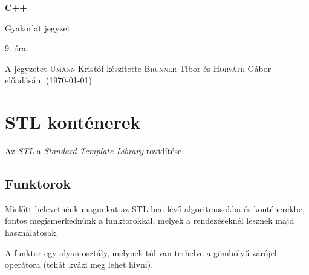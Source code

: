 \documentclass[a4paper,11.5pt]{article}
\begin{document}
	\setlength\parindent{0pt}
	\def\s{\hspace{0.2mm}\vphantom{\beta}}
	\def\Z{\mathbb{Z}}
	\def\Q{\mathbb{Q}}
	\def\R{\mathbb{R}}
	\def\C{\mathbb{C}}
	\def\N{\mathbb{N}}
	\def\Ra{\overline{\mathbb{R}}}
	
	\def\sume{\displaystyle\sum_{n=1}^{+\infty}}
	\def\sumn{\displaystyle\sum_{n=0}^{+\infty}}
	
	\def\narrow{\underset{n\rightarrow+\infty}{\longrightarrow}}
	\def\limn{\displaystyle\lim_{n\to +\infty}}
	\def\limx{\displaystyle\lim_{x\to +\infty}}
	
	\theoremstyle{definition}
	\newtheorem{theorem}{Tétel}[subsection] 
	
	\theoremstyle{definition}
	\newtheorem{definition}[theorem]{Definíció} 
	\newtheorem{example}[theorem]{Példa} 
	\newtheorem{task}[theorem]{Feladat} 
	\newtheorem{note}[theorem]{Megjegyzés}
	\begin{center}
		{\LARGE\textbf{C++}}
		
		{\Large Gyakorlat jegyzet}
		
		9. óra.
	\end{center}
	A jegyzetet \textsc{Umann} Kristóf készítette \textsc{Brunner} Tibor és \textsc{Horváth} Gábor előadásán. (\today)
	
	\section{STL konténerek}

	Az \textit{STL} a \textit{Standard Template Library} rövidítése.
	\subsection{Funktorok}
	Mielőtt belevetnénk magunkat az STL-ben lévő algoritmusokba és konténerekbe, fontos megismerkednünk a funktorokkal, melyek a rendezéseknél lesznek majd használatosak.
	\medskip
	
	A funktor egy olyan osztály, melynek túl van terhelve a gömbölyű zárójel operátora (tehát kvázi meg lehet hívni).
	
\end{document}
